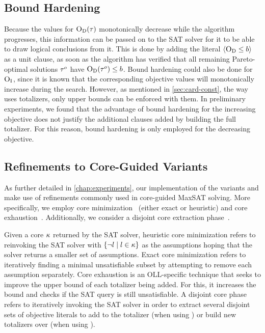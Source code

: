 \subsection{Bound Hardening}

Because the values for $\textsc{O}_{\text{D}}(\tau)$ monotonically decrease while the algorithm progresses, this information can be passed on to the SAT solver for it to be able to draw logical conclusions from it.
This is done by adding the literal $\langle \textsc{O}_{\text{D}} \leq b \rangle$ as a unit clause, as soon as the algorithm has verified that all remaining Pareto-optimal solutions $\tau^o$ have $\textsc{O}_{\text{D}}(\tau^o)\le b$.
Bound hardening could also be done for $\textsc{O}_{\text{I}}$, since it is known that the corresponding objective values will monotonically increase during the search.
However, as mentioned in \cref{sec:card-const}, the way \algname{} uses totalizers, only upper bounds can be enforced with them.
In preliminary experiments, we found that the advantage of bound hardening for the increasing objective does not justify the additional clauses added by building the full totalizer.
For this reason, bound hardening is only employed for the decreasing objective.

\subsection{Refinements to Core-Guided Variants}

As further detailed in \cref{chap:experiments}, our implementation of the \algname{} variants \msu{} and \oll{} make use of refinements commonly used in core-guided MaxSAT solving.
More specifically, we employ core minimization~\autocite{DBLP:journals/jsat/IgnatievMM19} (either exact or heuristic) and core exhaustion~\autocites{DBLP:journals/jsat/IgnatievMM19,DBLP:conf/cp/AnsoteguiBGL13}.
Additionally, we consider a disjoint core extraction phase~\autocite{DBLP:conf/cp/DaviesB11}.

Given a core $\kappa$ returned by the SAT solver, heuristic core minimization refers to reinvoking the SAT solver with $\{\lnot l \mid l \in \kappa\}$ as the assumptions hoping that the solver returns a smaller set of assumptions.
Exact core minimization refers to iteratively finding a minimal unsatisfiable subset by attempting to remove each assumption separately.
Core exhaustion is an OLL-specific technique that seeks to improve the upper bound of each totalizer being added.
For this, it increases the bound and checks if the SAT query is still unsatisfiable.
A disjoint core phase refers to iteratively invoking the SAT solver in order to extract several disjoint sets of objective literals to add to the totalizer (when using \msu{}) or build new totalizers over (when using \oll{}).